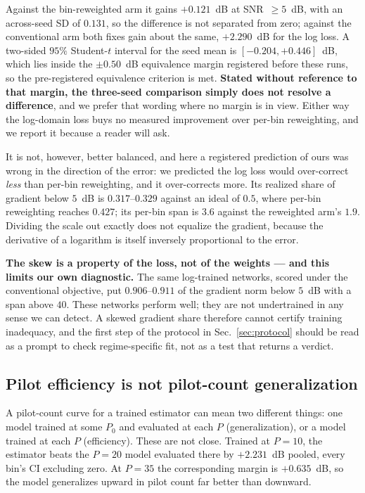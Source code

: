 \documentclass[journal]{IEEEtran}
\begin{document}
Against the bin-reweighted arm it gains $+0.121$~dB at SNR~$\ge5$~dB, with an
across-seed SD of $0.131$, so the difference is not separated from zero;
against the conventional arm both fixes gain about the same,
$+2.290$~dB for the log loss. A two-sided $95\%$ Student-$t$
interval for the seed mean is $[-0.204,+0.446]$~dB, which lies inside the
$\pm0.50$~dB equivalence margin registered before these runs, so the
pre-registered equivalence criterion is met. \textbf{Stated without reference
to that margin, the three-seed comparison simply does not resolve a
difference}, and we prefer that wording where no margin is in view. Either way
the log-domain loss buys no measured improvement over per-bin reweighting, and
we report it because a reader will ask.

It is not, however, better balanced, and here a registered prediction of ours
was wrong in the direction of the error: we predicted the log loss would
over-correct \emph{less} than per-bin reweighting, and it over-corrects more.
Its realized share of gradient below
$5$~dB is
$0.317$--$0.329$ against an ideal of $0.5$, where per-bin reweighting reaches
$0.427$; its per-bin span is $3.6$ against the reweighted arm's $1.9$. Dividing
the scale out exactly does not equalize the gradient, because the derivative of
a logarithm is itself inversely proportional to the error.

\textbf{The skew is a property of the loss, not of the weights --- and this
limits our own diagnostic.} The same log-trained networks, scored under the
conventional objective, put $0.906$--$0.911$ of the gradient norm below $5$~dB
with a span above $40$. These networks perform well; they are not undertrained
in any sense we can detect. A skewed gradient share therefore cannot certify
training inadequacy, and the first step of the protocol in
Sec.~\ref{sec:protocol} should be read as a prompt to check regime-specific
fit, not as a test that returns a verdict.

\subsection{Pilot efficiency is not pilot-count generalization}

A pilot-count curve for a trained estimator can mean two different things: one
model trained at some $P_0$ and evaluated at each $P$ (generalization), or a
model trained at each $P$ (efficiency). These are not close.
Trained at $P=10$, the estimator beats the $P=20$ model evaluated there by
$+2.231$~dB pooled, every bin's CI excluding zero. At $P=35$ the corresponding
margin is $+0.635$~dB, so the model generalizes upward in pilot count far
better than downward.
\end{document}
